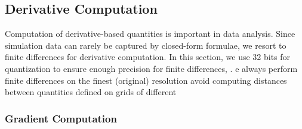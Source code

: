 \subsection{Derivative Computation} \label{sec:derivatives}


Computation of derivative-based quantities  is important in data
analysis. Since simulation data can rarely be captured by closed-form formulae, we resort to finite
differences for derivative computation. In this section, we use 32 bits  for
quantization to ensure enough precision for finite differences, . e always perform finite
differences on the finest (original) resolution  avoid 
 computing
distances between quantities defined on grids of different  

\subsubsection{Gradient Computation} \label{sec:gradient}

